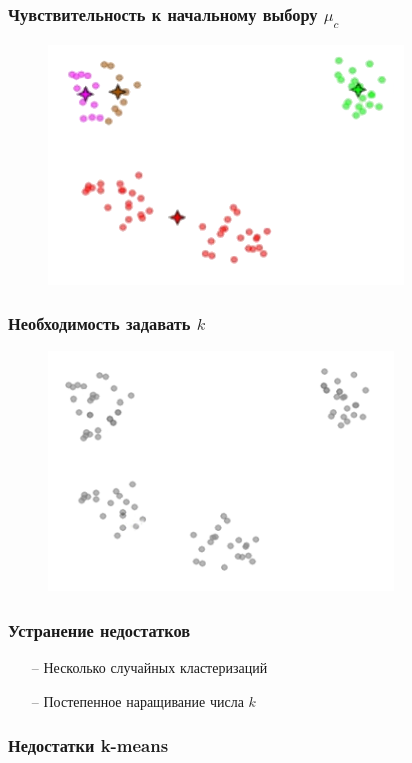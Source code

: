 \documentclass[12pt]{beamer}
\begin{document}
\begin{frame}\frametitle{Чувствительность к начальному выбору $\mu_c$}
\begin{figure}[htbp]
  \includegraphics[height=180pt, keepaspectratio = true]{images/local_min7}  
\end{figure}
\end{frame}

\begin{frame}\frametitle{Необходимость задавать $k$}
\begin{figure}[htbp]
  \includegraphics[height=180pt, keepaspectratio = true]{images/k_means_k}  
\end{figure}
\end{frame}

\begin{frame}\frametitle{Устранение недостатков}
\begin{itemize}
\item[--] Несколько случайных кластеризаций
\item[--] Постепенное наращивание числа $k$
\end{itemize}
\end{frame}

\begin{frame}\frametitle{Недостатки k-means}
\end{frame}
\end{document}

